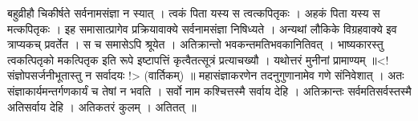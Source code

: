 बहुव्रीहौ चिकीर्षते सर्वनामसंज्ञा न स्यात् । त्वकं पिता यस्य स
त्वत्कपितृकः । अहकं पिता यस्य स मत्कपितृकः । इह समासात्प्रागेव
प्रक्रियावाक्ये सर्वनामसंज्ञा निषिध्यते । अन्यथां लौकिके विग्रहवाक्ये इव
त्राप्यकच् प्रवर्तेत । स च समासेऽपि श्रूयेत । अतिक्रान्तो
भवकन्तमतिभवकानितिवत् । भाष्यकारस्तु त्वकत्पितृको मकत्पितृक इति रूपे
इष्टापत्तिं कृत्वैतत्सूत्रं प्रत्याचख्यौ । यथोत्तरं मुनीनां प्रामाण्यम्
॥\textless{}!संज्ञोपसर्जनीभूतास्तु न सर्वादयः !\textgreater{}
(वार्तिकम्) ॥ महासंज्ञाकरणेन तदनुगुणानामेव गणे संनिवेशात् । अतः
संज्ञाकार्यमन्तर्गणकार्यं च तेषां न भवति । सर्वो नाम कश्चित्तस्मै सर्वाय
देहि । अतिक्रान्तः सर्वमतिसर्वस्तस्मै अतिसर्वाय देहि । अतिकतरं कुलम् ।
अतितत् ॥
